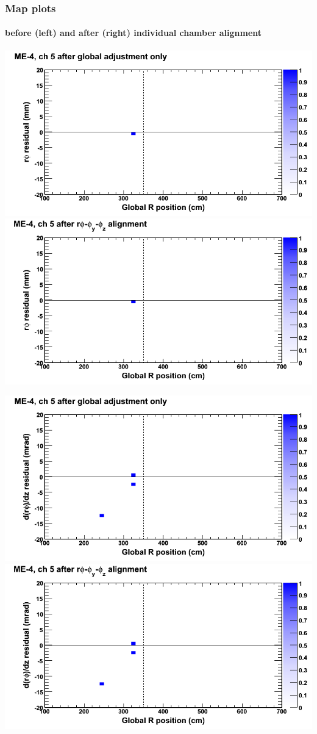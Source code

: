 \documentclass[compress]{beamer}
\begin{document}
\begin{frame}
\frametitle{Map plots}
\framesubtitle{before (left) and after (right) individual chamber alignment}
\includegraphics[width=0.5\linewidth]{ringmapplots_3dof/before_CSCvsr_mem4ch05_x.png} \includegraphics[width=0.5\linewidth]{ringmapplots_3dof/after_CSCvsr_mem4ch05_x.png}

\includegraphics[width=0.5\linewidth]{ringmapplots_3dof/before_CSCvsr_mem4ch05_dxdz.png} \includegraphics[width=0.5\linewidth]{ringmapplots_3dof/after_CSCvsr_mem4ch05_dxdz.png}
\end{frame}
\end{document}

